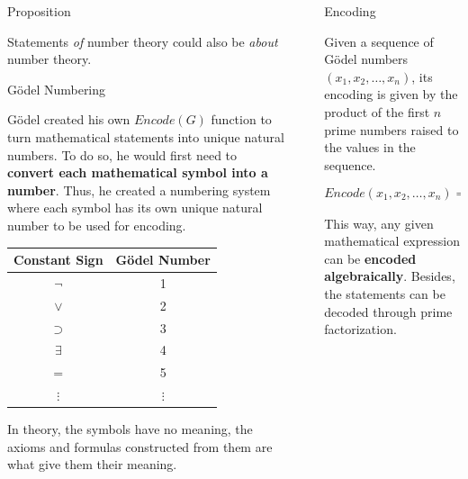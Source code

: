 \documentclass[final]{beamer}
\newlength{\sepwidth}
\newlength{\colwidth}
\newcommand{\separatorcolumn}{\begin{column}{\sepwidth}\end{column}}
\begin{document}
\begin{frame}[t]
\begin{columns}[t]
\begin{column}{\colwidth}
\begin{exampleblock}{Proposition}

      Statements \textit{of} number theory could also be \textit{about} number theory.

\end{exampleblock}


\begin{block}{Gödel Numbering}

    Gödel created his own $Encode(G)$ function to turn mathematical statements into unique natural numbers. To do so, he would first need to \textbf{convert each mathematical symbol into a number}. Thus, he created a numbering system where each symbol has its own unique natural number to be used for encoding.

    \begin{table}[h]
    \centering
    \begin{tabular}{c|c}
    \textbf{Constant Sign} & \textbf{Gödel Number} \\ \hline
    $\neg$ & 1 \\ 
    $\lor$ & 2 \\ 
    $\supset$ & 3 \\ 
    $\exists$ & 4 \\ 
    $=$ & 5 \\ 
    $\vdots$ & $\vdots$ \\ 
    \end{tabular}
    \end{table}

    In theory, the symbols have no meaning, the axioms and formulas constructed from them are what give them their meaning.
    
  \end{block}

\end{column}


\separatorcolumn %


\begin{column}{\colwidth}


  \begin{block}{Encoding}

    Given a sequence of Gödel numbers $(x_1, x_2, \dots, x_n)$, its encoding is given by the product of the first $n$ prime numbers raised to the values in the sequence.

    $$Encode(x_1, x_2, \dots, x_n) = 2^{x_1} \times 3^{x_2} \times \ldots \times p_n^{x_n}$$

    This way, any given mathematical expression can be \textbf{encoded algebraically}. Besides, the statements can be decoded through prime factorization.


\end{block}
\end{column}
\end{columns}
\end{frame}
\end{document}
